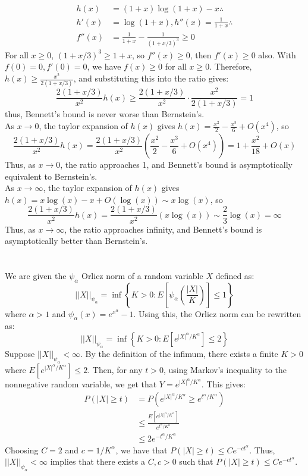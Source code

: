 \documentclass[11pt,a4paper,margin=1in]{article}
\begin{document}
\begin{enumerate}[(a)]
\begin{align*}
        h(x) &= (1 + x)\log(1 + x) - x \therefore \\
        h'(x) &= \log(1 + x), h''(x) = \frac{1}{1 + x} \therefore \\
        f''(x) &= \frac{1}{1 + x} - \frac{1}{(1 + x/3)^3} \geq 0 
    \end{align*}
    For all $x \geq 0$, $(1 + x/3)^3 \geq 1 + x$, so $f''(x) \geq 0$, then $f'(x) \geq 0$ 
    also. With $f(0) = 0, f'(0) = 0$, we have $f(x) \geq 0$ for all $x \geq 0$. 
    Therefore, $h(x) \geq \frac{x^2}{2(1 + x/3)}$, and substituting this into the ratio gives:
    \[
        \frac{2(1 + x/3)}{x^2} h(x) \geq \frac{2(1 + x/3)}{x^2} \cdot \frac{x^2}{2(1 + x/3)} = 1
    \]
    thus, Bennett's bound is never worse than Bernstein's. \\
    As $x \to 0$, the taylor expansion of $h(x)$ gives $h(x) = \frac{x^2}{2} - \frac{x^3}{6} + O(x^4)$, so
    \[
        \frac{2(1 + x/3)}{x^2} h(x) = \frac{2(1 + x/3)}{x^2} \left(\frac{x^2}{2} - \frac{x^3}{6} + O(x^4)\right) = 1 + \frac{x^2}{18} + O(x)
    \]
    Thus, as $x \to 0$, the ratio approaches 1, and Bennett's bound is asymptotically 
    equivalent to Bernstein's. \\
    As $x \to \infty$, the taylor expansion of $h(x)$ gives $h(x) = x\log(x) - x + O(\log(x)) \sim x\log(x)$, so
    \[
        \frac{2(1 + x/3)}{x^2} h(x) = \frac{2(1 + x/3)}{x^2} (x\log(x)) \sim \frac{2}{3}\log(x) = \infty
    \]
    Thus, as $x \to \infty$, the ratio approaches infinity, and Bennett's bound is 
    asymptotically better than Bernstein's.
\end{enumerate}

\section{}
We are given the $\psi_\alpha$ Orlicz norm of a random variable $X$ defined as:
\[
    ||X||_{\psi_\alpha} = \inf\left\{K > 0 : E\left[\psi_\alpha \left(\frac{|X|}{K}\right)\right] \leq 1\right\}
\]
where $\alpha > 1$ and $\psi_\alpha(x) = e^{x^\alpha} - 1$. Using this, the
Orlicz norm can be rewritten as:
\[
    ||X||_{\psi_\alpha} = \inf\left\{K > 0 : E\left[e^{|X|^\alpha/K^\alpha}\right] \leq 2\right\}
\]
Suppose $||X||_{\psi_\alpha} < \infty$. By the definition of the infimum,
there exists a finite $K > 0$ where $E[e^{|X|^\alpha/K^\alpha}] \leq 2$. Then, 
for any $t > 0$, using Markov's inequality to the nonnegative random variable,
we get that $Y = e^{|X|^\alpha/K^\alpha}$. This gives:
\begin{align*}
    P(|X| \geq t) &= P(e^{|X|^\alpha/K^\alpha} \geq e^{t^\alpha/K^\alpha}) \\
    &\leq \frac{E[e^{|X|^\alpha/K^\alpha}]}{e^{t^\alpha/K^\alpha}} \\
    &\leq 2 e^{-t^\alpha/K^\alpha}
\end{align*}
Choosing $C = 2$ and $c = 1/K^\alpha$, we have that $P(|X| \geq t) \leq C e^{-ct^\alpha}$.
Thus, $||X||_{\psi_\alpha} < \infty$ implies that there exists a $C, c > 0$ such 
that $P(|X| \geq t) \leq C e^{-ct^\alpha}$. \\
\end{document}
